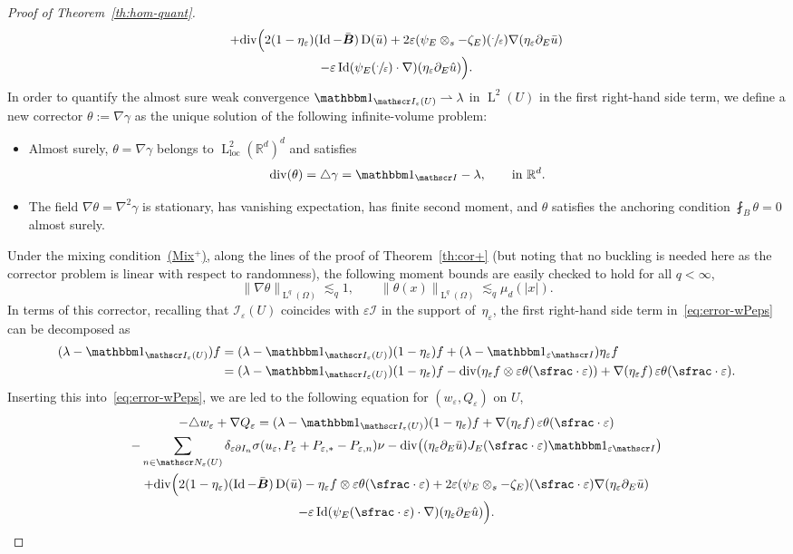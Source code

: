 \documentclass[10pt]{amsart}
\let\mathcal\mathscr
\newcommand{\Mix}{\hyperref[Mix+]{\textup{(Mix$^+$)}}\xspace}
\let\mathds\mathbbm
\theoremstyle{plain}
\theoremstyle{definition}
\newcommand{\e}{\varepsilon}
\newcommand{\R}{\mathbb R}
\newcommand{\Ic}{\mathcal I}
\newcommand{\Nc}{\mathcal N}
\newcommand{\cvf}{\rightharpoonup}
\newcommand{\loc}{{\operatorname{loc}}}
\newcommand{\Id}{\operatorname{Id}}
\newcommand{\D}{\operatorname{D}}
\newcommand{\Bb}{\bar{\boldsymbol B}}
\newcommand{\Ld}{\operatorname{L}}
\newcommand{\Div}{{\operatorname{div}}}
\begin{document}
\begin{proof}[Proof of Theorem~\ref{th:hom-quant}]
\begin{multline}
+\Div\Big(2(1-\eta_\e)(\Id-\Bb)\D(\bar u)+2\e(\psi_E\otimes_s-\zeta_E)(\sfrac\cdot\e)\nabla(\eta_\e\partial_E\bar u)\\
-\e\Id(\psi_E(\sfrac\cdot\e)\cdot\nabla)(\eta_\e\partial_E\hat u)\Big).
\end{multline}
In order to quantify the almost sure weak convergence $\mathds1_{\Ic_\e(U)}\cvf\lambda$ in $\Ld^2(U)$ in the first right-hand side term, we define a new corrector $\theta:=\nabla\gamma$ as the unique solution of the following infinite-volume problem:
\begin{itemize}
\item Almost surely, $\theta=\nabla\gamma$ belongs to $\Ld^2_\loc(\R^d)^d$ and satisfies
\[\Div(\theta)=\triangle\gamma=\mathds1_{\Ic}-\lambda,\qquad\text{in $\R^d$}.\]
\item The field $\nabla\theta=\nabla^2\gamma$ is stationary, has vanishing expectation, has finite second moment, and $\theta$ satisfies the anchoring condition $\fint_B\theta=0$ almost surely.
\end{itemize}
Under the mixing condition~\Mix, along the lines of the proof of Theorem~\ref{th:cor+} (but noting that no buckling is needed here as the corrector problem is linear with respect to randomness),
the following moment bounds are easily checked to hold for all $q<\infty$,
\begin{equation}\label{eq:bnd-gam}
\|\nabla\theta\|_{\Ld^q(\Omega)}\lesssim_q 1,
\qquad
\|\theta(x)\|_{\Ld^q(\Omega)}\lesssim_q \mu_d(|x|).
\end{equation}
In terms of this corrector, recalling that $\Ic_\e(U)$ coincides with $\e\Ic$ in the support of~$\eta_\e$, the first right-hand side term in~\eqref{eq:error-wPeps} can be decomposed as
\begin{align*}
(\lambda-\mathds1_{\Ic_\e(U)})f&= (\lambda-\mathds1_{\Ic_\e(U)})(1-\eta_\e)f+(\lambda-\mathds1_{\e\Ic})\eta_\e f\\
&= (\lambda-\mathds1_{\Ic_\e(U)})(1-\eta_\e)f-\Div(\eta_\e f\otimes \e\theta(\sfrac\cdot\e))+\nabla(\eta_\e f)\,\e\theta(\sfrac\cdot\e).
\end{align*}
Inserting this into~\eqref{eq:error-wPeps}, we are led to the following equation for $(w_\e,Q_\e)$ on $U$,
\begin{multline}\label{eq:error-wPeps+}
-\triangle w_\e+\nabla Q_\e=(\lambda-\mathds1_{\Ic_\e(U)})(1-\eta_\e)f+\nabla(\eta_\e f)\,\e\theta(\sfrac\cdot\e)\\
-\sum_{n\in\Nc_\e(U)}\delta_{\e\partial I_n}\sigma(u_\e,P_\e+P_{\e,*}-P_{\e,n})\nu
-\Div\big((\eta_\e\partial_E\bar u)J_E(\sfrac\cdot\e)\mathds1_{\e\Ic}\big)\\
+\Div\Big(2(1-\eta_\e)(\Id-\Bb)\D(\bar u)-\eta_\e f\otimes \e\theta(\sfrac\cdot\e)
+2\e(\psi_E\otimes_s-\zeta_E)(\sfrac\cdot\e)\nabla(\eta_\e\partial_E\bar u)\\
-\e\Id(\psi_E(\sfrac\cdot\e)\cdot\nabla)(\eta_\e\partial_E\hat u)\Big).
\end{multline}


\end{proof}
\end{document}
